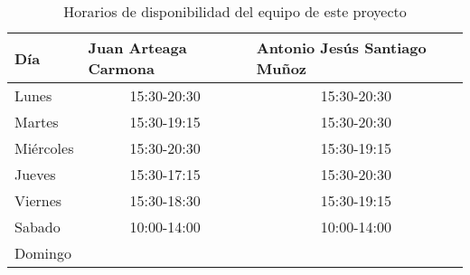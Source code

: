 \begin{table}[h]
\centering
\begin{tabular}{@{}lcc@{}}
\toprule
Día       & \multicolumn{1}{l}{Juan Arteaga Carmona} & \multicolumn{1}{l}{Antonio Jesús Santiago Muñoz} \\ \midrule
Lunes     & 15:30-20:30                              & 15:30-20:30                                      \\
Martes    & 15:30-19:15                              & 15:30-20:30                                      \\
Miércoles & 15:30-20:30                              & 15:30-19:15                                      \\
Jueves    & 15:30-17:15                              & 15:30-20:30                                      \\
Viernes   & 15:30-18:30                              & 15:30-19:15                                      \\
Sabado    & 10:00-14:00                              & 10:00-14:00                                      \\
Domingo   & \multicolumn{1}{l}{}                     & \multicolumn{1}{l}{}                             \\ \bottomrule
\end{tabular}
\caption{Horarios de disponibilidad del equipo de este proyecto}
\label{tab_horarios}
\end{table}


